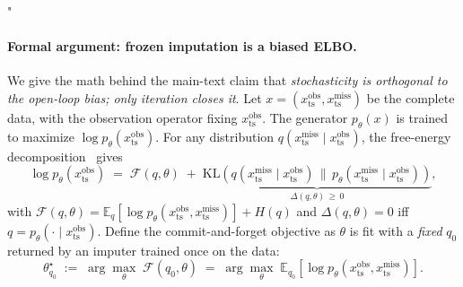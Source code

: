 "\documentclass{article}
\theoremstyle{plain}
\theoremstyle{definition}
\theoremstyle{remark}
\newcommand{\xts}{x_{\mathrm{ts}}}
\begin{document}
\paragraph{Formal argument: frozen imputation is a biased ELBO.}
We give the math behind the main-text claim that \emph{stochasticity is orthogonal to the open-loop bias; only iteration closes it}. Let $x = (\xts^{\mathrm{obs}}, \xts^{\mathrm{miss}})$ be the complete data, with the observation operator fixing $\xts^{\mathrm{obs}}$. The generator $p_\theta(x)$ is trained to maximize $\log p_\theta(\xts^{\mathrm{obs}})$. For any distribution $q(\xts^{\mathrm{miss}}\mid\xts^{\mathrm{obs}})$, the free-energy decomposition~\citep{neal1998em} gives
\begin{equation}
\label{eq:free-energy-app}
\log p_\theta(\xts^{\mathrm{obs}}) \;=\; \mathcal{F}(q, \theta) \;+\; \underbrace{\mathrm{KL}\!\left(q(\xts^{\mathrm{miss}}\mid\xts^{\mathrm{obs}})\,\big\|\,p_\theta(\xts^{\mathrm{miss}}\mid\xts^{\mathrm{obs}})\right)}_{\Delta(q,\theta)\,\geq\,0},
\end{equation}
with $\mathcal{F}(q,\theta) = \mathbb{E}_q[\log p_\theta(\xts^{\mathrm{obs}},\xts^{\mathrm{miss}})] + H(q)$ and $\Delta(q,\theta) = 0$ iff $q = p_\theta(\cdot\mid\xts^{\mathrm{obs}})$. Define the commit-and-forget objective as $\theta$ is fit with a \emph{fixed} $q_0$ returned by an imputer trained once on the data:
\begin{equation}
\theta^\star_{q_0} \;:=\; \arg\max_\theta \; \mathcal{F}(q_0, \theta) \;=\; \arg\max_\theta \;\mathbb{E}_{q_0}[\log p_\theta(\xts^{\mathrm{obs}},\xts^{\mathrm{miss}})].
\end{equation}
\end{document}
